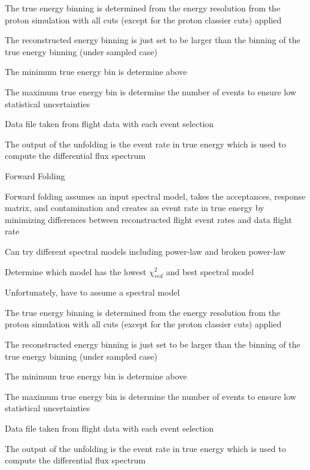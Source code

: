 \documentclass{article}
\begin{document}
\begin{myEnumerate}
\begin{myEnumerate}
\begin{myEnumerate}
				\item The true energy binning is determined from the energy resolution from the proton simulation with all cuts (except for the proton classier cuts) applied
				\item The reconstructed energy binning is just set to be larger than the binning of the true energy binning (under sampled case)
				\item The minimum true energy bin is determine above
				\item The maximum true energy bin is determine the number of events to ensure low statistical uncertainties
				\item Data file taken from flight data with each event selection
				\item The output of the unfolding is the event rate in true energy which is used to compute the differential flux spectrum
			\end{myEnumerate}
			\item Forward Folding
			\begin{myEnumerate}
				\item Forward folding assumes an input spectral model, takes the acceptances, response matrix, and contamination and creates an event rate in true energy by minimizing differences between reconstructed flight event rates and data flight rate
				\item Can try different spectral models including power-law and broken power-law
				\item Determine which model has the lowest $\chi^2_{red}$ and best spectral model
				\item Unfortunately, have to assume a spectral model
				\item The true energy binning is determined from the energy resolution from the proton simulation with all cuts (except for the proton classier cuts) applied
				\item The reconstructed energy binning is just set to be larger than the binning of the true energy binning (under sampled case)
				\item The minimum true energy bin is determine above
				\item The maximum true energy bin is determine the number of events to ensure low statistical uncertainties
				\item Data file taken from flight data with each event selection
				\item The output of the unfolding is the event rate in true energy which is used to compute the differential flux spectrum

\end{myEnumerate}
\end{myEnumerate}
\end{myEnumerate}
\end{document}
